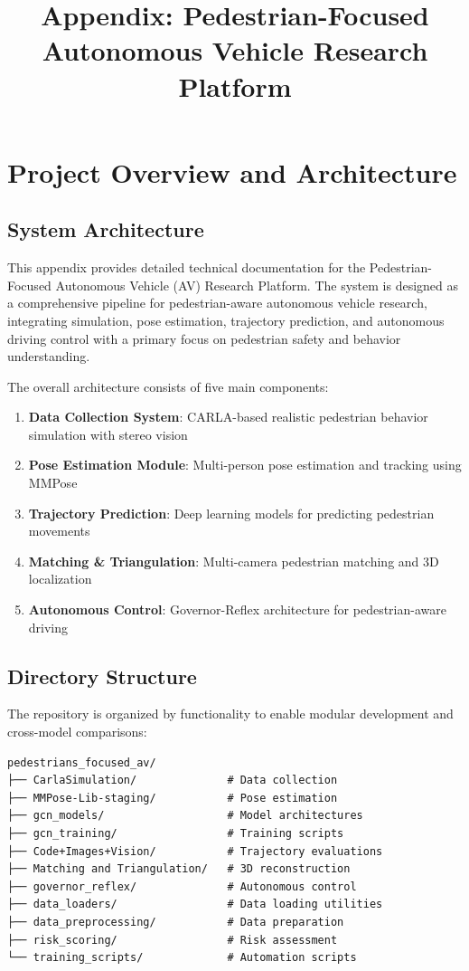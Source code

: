 \documentclass[11pt,a4paper]{article}
\title{\textbf{Appendix: Pedestrian-Focused Autonomous Vehicle Research Platform}}
\author{}
\date{}
\begin{document}
\maketitle

\appendix

\section{Project Overview and Architecture}

\subsection{System Architecture}

This appendix provides detailed technical documentation for the Pedestrian-Focused Autonomous Vehicle (AV) Research Platform. The system is designed as a comprehensive pipeline for pedestrian-aware autonomous vehicle research, integrating simulation, pose estimation, trajectory prediction, and autonomous driving control with a primary focus on pedestrian safety and behavior understanding.

The overall architecture consists of five main components:

\begin{enumerate}
    \item \textbf{Data Collection System}: CARLA-based realistic pedestrian behavior simulation with stereo vision
    \item \textbf{Pose Estimation Module}: Multi-person pose estimation and tracking using MMPose
    \item \textbf{Trajectory Prediction}: Deep learning models for predicting pedestrian movements
    \item \textbf{Matching \& Triangulation}: Multi-camera pedestrian matching and 3D localization
    \item \textbf{Autonomous Control}: Governor-Reflex architecture for pedestrian-aware driving
\end{enumerate}

\subsection{Directory Structure}

The repository is organized by functionality to enable modular development and cross-model comparisons:

\begin{verbatim}
pedestrians_focused_av/
├── CarlaSimulation/              # Data collection
├── MMPose-Lib-staging/           # Pose estimation
├── gcn_models/                   # Model architectures
├── gcn_training/                 # Training scripts
├── Code+Images+Vision/           # Trajectory evaluations
├── Matching and Triangulation/   # 3D reconstruction
├── governor_reflex/              # Autonomous control
├── data_loaders/                 # Data loading utilities
├── data_preprocessing/           # Data preparation
├── risk_scoring/                 # Risk assessment
└── training_scripts/             # Automation scripts
\end{verbatim}
\end{document}
